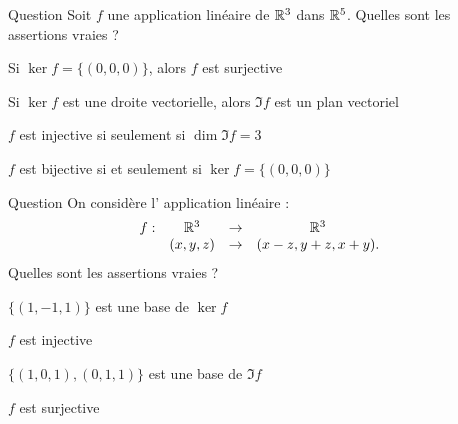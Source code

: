 \begin{multi}[multiple,feedback=
{\(f\) est injective si et seulement si \(\ker f = \{(0,0,0)\}\). \(f\) ne peut pas être surjective, puisque d'après le théorème du rang, la dimension de \(\Im f \) est au plus \(3\).
}]{Question}
Soit \(f\) une application linéaire de \(\mathbb{R}^3\) dans \(\mathbb{R}^5\). Quelles sont les assertions vraies ?

    \item Si \(\ker f = \{(0,0,0)\}\), alors \(f\) est surjective
    \item* Si \(\ker f \) est une droite vectorielle, alors \(\Im f \) est un plan vectoriel
    \item* \(f\) est injective si seulement si \(\dim \Im f =3\)
    \item \(f\) est  bijective si et seulement si \(\ker f=\{(0,0,0)\}\)
\end{multi}


\begin{multi}[multiple,feedback=
{\(\ker f = \{(x,y,z) \in \Rr^3 \; ; \; (x-z,y+z,x+y)=(0,0,0)\} = \{(x,-x,x)  \; ; \; x\in \Rr\}\). Donc \( \{(1,-1,1)\}\) est une base de \(\ker f\). Comme \(\ker f \neq \{(0,0,0)\}\), \(f\) n'est pas injective.
\vskip0mm
D'après le théorème du rang, \(\dim \Im f = 2 \) et comme 
\(f(e_1)=(1,0,1)\) et \( f(e_2)=(0,1,1)\) ne sont pas colinéaires, ils forment une base de  \(\Im f\). Comme \(\dim \Im f = 2 \), \(\Im f \neq \Rr^3 \), donc \(f\) n'est pas surjective.
}]{Question}
On considère l' application linéaire : 
\[\begin{array}{rccc}f:&\mathbb{R}^3&\to&\mathbb{R}^3\\
& (x,y,z)&\to &(x-z,y+z,x+y). \end{array}\]
Quelles sont les assertions vraies ?

    \item* \(\{(1,-1,1)\}\) est une base de \(\ker f\)
    \item \(f\) est injective
    \item* \(\{(1,0,1), (0,1,1)\}\) est une base de \(\Im f\)
    \item \(f\) est surjective
\end{multi}


